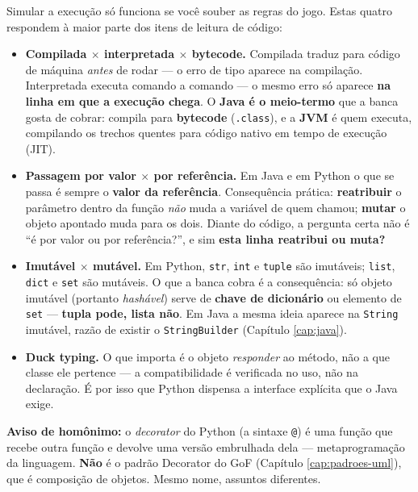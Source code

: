 \begin{conceito}
Simular a execução só funciona se você souber as regras do jogo. Estas quatro
respondem à maior parte dos itens de leitura de código:

\begin{itemize}
\item \textbf{Compilada $\times$ interpretada $\times$ bytecode.} Compilada
traduz para código de máquina \emph{antes} de rodar --- o erro de tipo aparece
na compilação. Interpretada executa comando a comando --- o mesmo erro só
aparece \textbf{na linha em que a execução chega}. O \textbf{Java é o
meio-termo} que a banca gosta de cobrar: compila para \textbf{bytecode}
(\texttt{.class}), e a \textbf{JVM} é quem executa, compilando os trechos
quentes para código nativo em tempo de execução (JIT).
\item \textbf{Passagem por valor $\times$ por referência.} Em Java e em Python
o que se passa é sempre o \textbf{valor da referência}. Consequência prática:
\textbf{reatribuir} o parâmetro dentro da função \emph{não} muda a variável de
quem chamou; \textbf{mutar} o objeto apontado muda para os dois. Diante do
código, a pergunta certa não é ``é por valor ou por referência?'', e sim
\textbf{esta linha reatribui ou muta?}
\item \textbf{Imutável $\times$ mutável.} Em Python, \texttt{str},
\texttt{int} e \texttt{tuple} são imutáveis; \texttt{list}, \texttt{dict} e
\texttt{set} são mutáveis. O que a banca cobra é a consequência: só objeto
imutável (portanto \emph{hashável}) serve de \textbf{chave de dicionário} ou
elemento de \texttt{set} --- \textbf{tupla pode, lista não}. Em Java a mesma
ideia aparece na \texttt{String} imutável, razão de existir o
\texttt{StringBuilder} (Capítulo \ref{cap:java}).
\item \textbf{Duck typing.} O que importa é o objeto \emph{responder} ao
método, não a que classe ele pertence --- a compatibilidade é verificada no
uso, não na declaração. É por isso que Python dispensa a interface explícita
que o Java exige.
\end{itemize}

\textbf{Aviso de homônimo:} o \emph{decorator} do Python (a sintaxe
\texttt{@}) é uma função que recebe outra função e devolve uma versão
embrulhada dela --- metaprogramação da linguagem. \textbf{Não} é o padrão
Decorator do GoF (Capítulo \ref{cap:padroes-uml}), que é composição de objetos.
Mesmo nome, assuntos diferentes.
\end{conceito}

